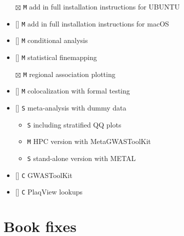 \documentclass[
]{book}
\newcommand{\passthrough}[1]{#1}
\providecommand{\tightlist}{%
  \setlength{\itemsep}{0pt}\setlength{\parskip}{0pt}}
\begin{document}
\begin{itemize}
\tightlist
\item[$\boxtimes$]
  \passthrough{\lstinline!M!} add in full installation instructions for UBUNTU
\item
  {[}{]} \passthrough{\lstinline!M!} add in full installation instructions for macOS
\item
  {[}{]} \passthrough{\lstinline!M!} conditional analysis
\item
  {[}{]} \passthrough{\lstinline!M!} statistical finemapping
\item[$\boxtimes$]
  \passthrough{\lstinline!M!} regional association plotting
\item
  {[}{]} \passthrough{\lstinline!M!} colocalization with formal testing
\item
  {[}{]} \passthrough{\lstinline!S!} meta-analysis with dummy data

  \begin{itemize}
  \tightlist
  \item
    \passthrough{\lstinline!S!} including stratified QQ plots
  \item
    \passthrough{\lstinline!M!} HPC version with MetaGWASToolKit
  \item
    \passthrough{\lstinline!S!} stand-alone version with METAL
  \end{itemize}
\item
  {[}{]} \passthrough{\lstinline!C!} GWASToolKit
\item
  {[}{]} \passthrough{\lstinline!C!} PlaqView lookups
\end{itemize}

\hypertarget{book-fixes}{%
\section{Book fixes}\label{book-fixes}}
\end{document}
